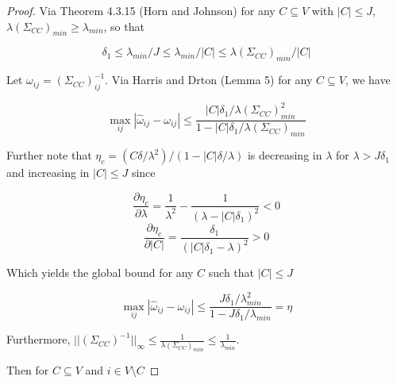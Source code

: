 \documentclass[]{article}
\begin{document}
\begin{proof}

Via Theorem 4.3.15 (Horn and Johnson) for any $C \subseteq V$ with $|C| \leq J$, $\lambda(\Sigma_{CC})_{min} \geq \lambda_{min}$, so that 

\[\delta_1 \leq \lambda_{min}/J \leq  \lambda_{min}/|C| \leq \lambda(\Sigma_{CC})_{min}/|C|\]

Let $\omega_{ij} = (\Sigma_{CC})^{-1}_{ij}$. Via Harris and Drton (Lemma 5) for any $C \subseteq V$, we have

\begin{equation}
\max_{ij}|\hat \omega_{ij} - \omega_{ij}| \leq \frac{|C|\delta_1 / \lambda(\Sigma_{CC})^2_{min}}{1 - |C|\delta_1 / \lambda(\Sigma_{CC})_{min} }
\end{equation}

Further note that $\eta_c = (C \delta/ \lambda^2) / (1 - |C| \delta / \lambda)$ is decreasing in $\lambda$ for $\lambda > J \delta_1$ and increasing in $|C| \leq J$ since

\begin{equation}
\frac{\partial \eta_c}{\partial \lambda} = \frac{1}{\lambda^2} - \frac{1}{(\lambda - |C| \delta_1)^2} < 0 
\end{equation}
\begin{equation}
\frac{\partial \eta_c}{\partial |C|} = \frac{\delta_1}{(|C|\delta_1-\lambda)^2} > 0 
\end{equation}

Which yields the global bound for any $C$ such that $|C| \leq J$

\begin{equation}
\max_{ij}|\hat \omega_{ij} - \omega_{ij}| \leq \frac{J\delta_1 / \lambda^2_{min}}{1 - J\delta_1 / \lambda_{min} } = \eta
\end{equation}


Furthermore, $||(\Sigma_{CC})^{-1}||_\infty \leq \frac{1}{\lambda(\Sigma_{CC})_{min}} \leq \frac{1}{\lambda_{min}}$. 

Then for $C \subseteq V$ and $i \in V\setminus C$


\end{proof}
\end{document}
